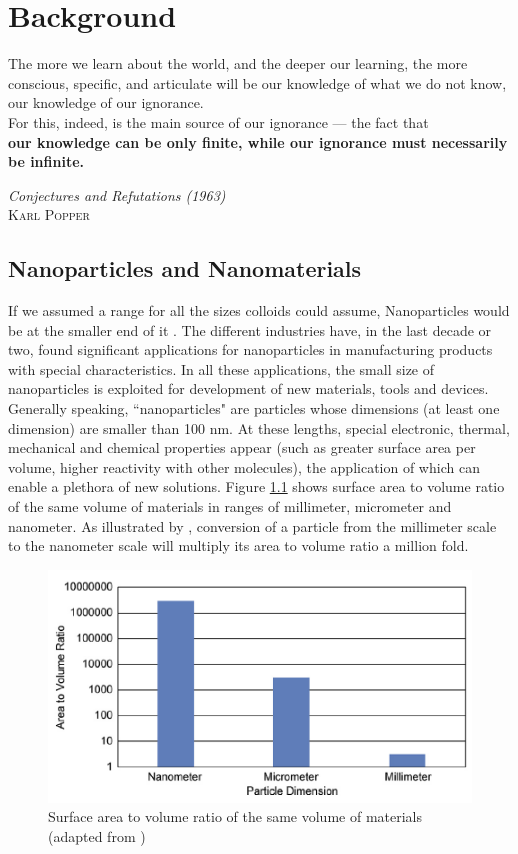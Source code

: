 \chapter{Background} \label{chap:background}
\vspace*{\fill}
\epigraph{The more we learn about the world, and the deeper our learning, the more conscious, specific, and articulate will be our knowledge of what we do not know, our knowledge of our ignorance.\\ For this, indeed, is the main source of our ignorance — the fact that\\ \textbf{our knowledge can be only finite, while our ignorance must necessarily be infinite.}}%
{\textit{Conjectures and Refutations (1963)}\\ \textsc{Karl Popper}}
\clearpage{\thispagestyle{empty}\cleardoublepage}
\section{Nanoparticles and Nanomaterials}
If we assumed a range for all the sizes colloids could assume, Nanoparticles would be at the smaller end of it \citep{Goodwin2009}. The different industries have, in the last decade or two, found significant applications for nanoparticles in manufacturing products with special characteristics. In all these applications, the small size of nanoparticles is exploited for development of new materials, tools and devices. Generally speaking, ``nanoparticles" are particles whose dimensions (at least one dimension) are smaller than 100 nm. At these lengths, special electronic, thermal, mechanical and chemical properties appear (such as greater surface area per volume, higher reactivity with other molecules), the application of which can enable a plethora of new solutions. Figure \ref{cht:NPsurfaceVolume} shows surface area to volume ratio of the same volume of materials in ranges of millimeter, micrometer and nanometer. As illustrated by \citet{Amanullah2009}, conversion of a particle from the millimeter scale to the nanometer scale will multiply its area to volume ratio a million fold. 
\begin{figure}[h]
    \centering
    \includegraphics[width=\textwidth]{img/cht/NPsurfaceVolume.png}
    \caption{Surface area to volume ratio of the same volume of materials (adapted from \citet{Amanullah2009})}
    \label{cht:NPsurfaceVolume}
\end{figure}


